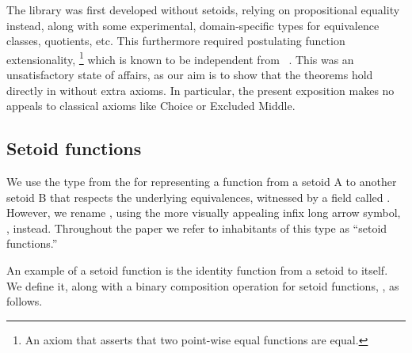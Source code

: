 \ddmmyydate


The \agdaalgebras library was first developed without setoids, relying on
propositional equality  instead,
along with some experimental, domain-specific types for equivalence classes, quotients, etc.
This furthermore required postulating function extensionality,%
\footnote{An axiom that asserts that two point-wise equal functions are equal.} which is
known to be independent from \mltt~\cite{MHE, MHE:2019}. This was
an unsatisfactory state of affairs, as %
our aim is to show that the theorems hold directly in \mltt without extra axioms.
In particular, the present exposition makes no appeals to classical axioms like Choice or Excluded Middle.


\subsection{Setoid functions}
\label{setoid-functions}
We use the  type from the \agdastdlib for representing a function from
a setoid \ab A to another setoid \ab B that respects the underlying equivalences,
witnessed by a field called .  However, we rename , using
the more visually appealing infix long arrow symbol,
, instead. Throughout the
paper we refer to inhabitants of this type as ``setoid functions.''

\ifshort\else
An example of a setoid function is the identity function from a setoid to itself.
We define it, along with a binary composition operation for setoid functions,
, as follows.

